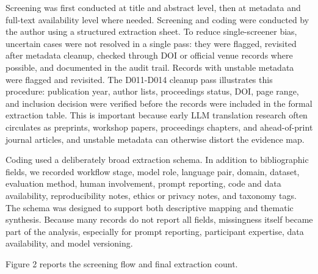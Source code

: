 \documentclass[11pt]{article}
\begin{document}
Screening was first conducted at title and abstract level, then at metadata and full-text availability level where needed. Screening and coding were conducted by the author using a structured extraction sheet. To reduce single-screener bias, uncertain cases were not resolved in a single pass: they were flagged, revisited after metadata cleanup, checked through DOI or official venue records where possible, and documented in the audit trail. Records with unstable metadata were flagged and revisited. The D011-D014 cleanup pass illustrates this procedure: publication year, author lists, proceedings status, DOI, page range, and inclusion decision were verified before the records were included in the formal extraction table. This is important because early LLM translation research often circulates as preprints, workshop papers, proceedings chapters, and ahead-of-print journal articles, and unstable metadata can otherwise distort the evidence map.

Coding used a deliberately broad extraction schema. In addition to bibliographic fields, we recorded workflow stage, model role, language pair, domain, dataset, evaluation method, human involvement, prompt reporting, code and data availability, reproducibility notes, ethics or privacy notes, and taxonomy tags. The schema was designed to support both descriptive mapping and thematic synthesis. Because many records do not report all fields, missingness itself became part of the analysis, especially for prompt reporting, participant expertise, data availability, and model versioning.

Figure 2 reports the screening flow and final extraction count.
\end{document}
